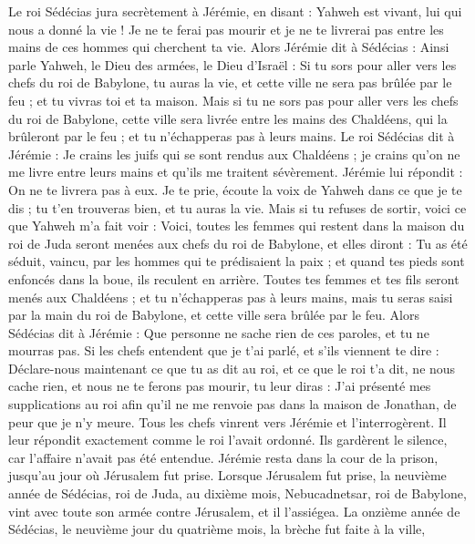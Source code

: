 \begin{multicols}{2}
Le roi Sédécias jura secrètement à Jérémie, en disant : Yahweh est vivant, lui qui nous a donné la vie ! Je ne te ferai pas mourir et je ne te livrerai pas entre les mains de ces hommes qui cherchent ta vie.
Alors Jérémie dit à Sédécias : Ainsi parle Yahweh, le Dieu des armées, le Dieu d'Israël : Si tu sors pour aller vers les chefs du roi de Babylone, tu auras la vie, et cette ville ne sera pas brûlée par le feu ; et tu vivras toi et ta maison.
Mais si tu ne sors pas pour aller vers les chefs du roi de Babylone, cette ville sera livrée entre les mains des Chaldéens, qui la brûleront par le feu ; et tu n'échapperas pas à leurs mains.
Le roi Sédécias dit à Jérémie : Je crains les juifs qui se sont rendus aux Chaldéens ; je crains qu'on ne me livre entre leurs mains et qu'ils me traitent sévèrement.
Jérémie lui répondit : On ne te livrera pas à eux. Je te prie, écoute la voix de Yahweh dans ce que je te dis ; tu t'en trouveras bien, et tu auras la vie.
Mais si tu refuses de sortir, voici ce que Yahweh m'a fait voir :
Voici, toutes les femmes qui restent dans la maison du roi de Juda seront menées aux chefs du roi de Babylone, et elles diront : Tu as été séduit, vaincu, par les hommes qui te prédisaient la paix ; et quand tes pieds sont enfoncés dans la boue, ils reculent en arrière.
Toutes tes femmes et tes fils seront menés aux Chaldéens ; et tu n'échapperas pas à leurs mains, mais tu seras saisi par la main du roi de Babylone, et cette ville sera brûlée par le feu.
Alors Sédécias dit à Jérémie : Que personne ne sache rien de ces paroles, et tu ne mourras pas.
Si les chefs entendent que je t'ai parlé, et s'ils viennent te dire : Déclare-nous maintenant ce que tu as dit au roi, et ce que le roi t’a dit, ne nous cache rien, et nous ne te ferons pas mourir,
tu leur diras : J'ai présenté mes supplications au roi afin qu'il ne me renvoie pas dans la maison de Jonathan, de peur que je n’y meure.
Tous les chefs vinrent vers Jérémie et l'interrogèrent. Il leur répondit exactement comme le roi l’avait ordonné. Ils gardèrent le silence, car l’affaire n’avait pas été entendue.
Jérémie resta dans la cour de la prison, jusqu’au jour où Jérusalem fut prise.
\VerseOne{}Lorsque Jérusalem fut prise, la neuvième année de Sédécias, roi de Juda, au dixième mois, Nebucadnetsar, roi de Babylone, vint avec toute son armée contre Jérusalem, et il l'assiégea.
La onzième année de Sédécias, le neuvième jour du quatrième mois, la brèche fut faite à la ville,

\end{multicols}
